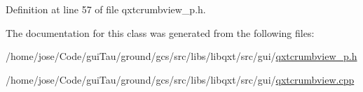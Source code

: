 Definition at line 57 of file qxtcrumbview\-\_\-p.\-h.



The documentation for this class was generated from the following files\-:\begin{DoxyCompactItemize}
\item 
/home/jose/\-Code/gui\-Tau/ground/gcs/src/libs/libqxt/src/gui/\hyperlink{qxtcrumbview__p_8h}{qxtcrumbview\-\_\-p.\-h}\item 
/home/jose/\-Code/gui\-Tau/ground/gcs/src/libs/libqxt/src/gui/\hyperlink{qxtcrumbview_8cpp}{qxtcrumbview.\-cpp}\end{DoxyCompactItemize}
